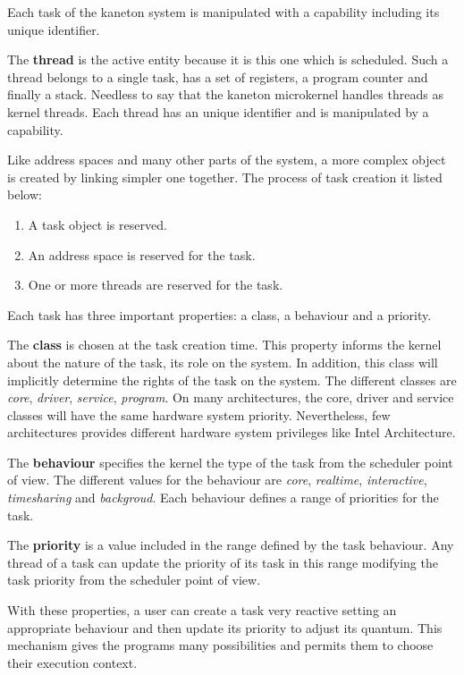 \begin{multicols}{2}
Each task of the kaneton system is manipulated with a capability including
its unique identifier.

The \textbf{thread} is the active entity because it is this one which is
scheduled. Such a thread belongs to a single task, has a set of registers,
a program counter and finally a stack. Needless to say that the kaneton
microkernel handles threads as kernel threads. Each thread has an unique
identifier and is manipulated by a capability.

Like address spaces and many other parts of the system, a more complex
object is created by linking simpler one together. The process of task creation
it listed below:

\begin{enumerate}
  \item
    A task object is reserved.
  \item
    An address space is reserved for the task.
  \item
    One or more threads are reserved for the task.
\end{enumerate}

Each task has three important properties: a class, a behaviour and a priority.

The \textbf{class} is chosen at the task creation time. This property
informs the kernel about the nature of the task, its role on the system.
In addition, this class will implicitly determine the rights of the task
on the system. The different classes are \textit{core}, \textit{driver},
\textit{service}, \textit{program}. On many architectures, the core, driver
and service classes will have the same hardware system priority.
Nevertheless, few architectures provides different hardware system privileges
like Intel Architecture.

The \textbf{behaviour} specifies the kernel the type of the task from the
scheduler point of view. The different values for the behaviour are
\textit{core}, \textit{realtime}, \textit{interactive}, \textit{timesharing}
and \textit{backgroud}. Each behaviour defines a range of priorities for the
task.

The \textbf{priority} is a value included in the range defined by the
task behaviour. Any thread of a task can update the priority of its
task in this range modifying the task priority from the scheduler
point of view.

With these properties, a user can create a task very reactive setting an
appropriate behaviour and then update its priority to adjust its quantum.
This mechanism gives the programs many possibilities and permits them to
choose their execution context.


\end{multicols}
